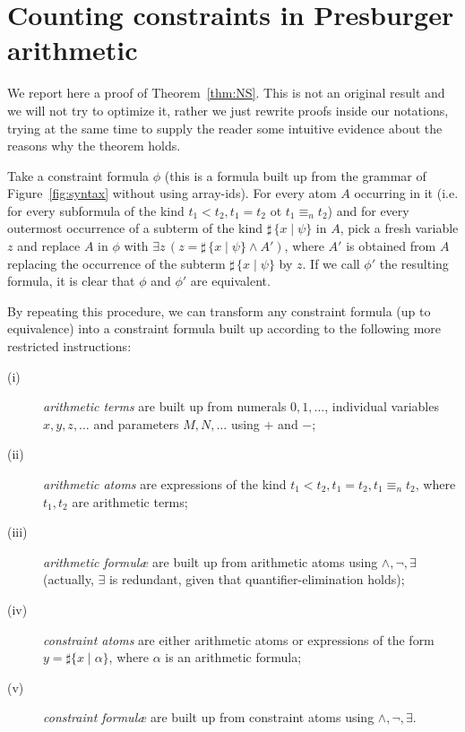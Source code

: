 \documentclass[11pt,a4paper]{article}
\newcommand{\formulae}{formul\ae\xspace}
\begin{document}
{



\vfill\eject 
\appendix


\section{Counting constraints in Presburger arithmetic}\label{app:counting}

We report here a proof of Theorem~\ref{thm:NS}. This is not an original result and we will not try to optimize it, rather we just rewrite  proofs inside our notations, 
trying at the same time to supply the reader some intuitive evidence about the reasons why the theorem
holds.


Take a constraint formula  $\phi$ (this is a formula built up from the  grammar of Figure~\ref{fig:syntax} without using
 array-ids). For every atom $A$ occurring in it (i.e. for every subformula of the kind $t_1< t_2, t_1= t_2$ ot $t_1\equiv_n t_2$)
 and for every outermost occurrence of a subterm of the kind $\sharp\, \{ x\mid \psi\}$ in $A$, pick a fresh variable $z$ and replace $A$
 in $\phi$ with 
 $\exists z\, (z= \sharp\, \{ x\mid \psi\} \wedge A')$, where $A'$ is obtained from $A$ replacing the occurrence of the 
 subterm $\sharp\, \{ x\mid \psi\}$ by $z$. If we call $\phi'$ the resulting formula, it is clear that $\phi$ and $\phi'$ are equivalent.
 
 By repeating this procedure, we can transform any constraint formula (up to equivalence) into a constraint formula built up according to the following
 more restricted instructions:
\begin{description}
  \item[{\rm (i)}] \emph{arithmetic terms} are built up from numerals $0, 1, \dots $, individual variables $x, y, z, \dots $ and parameters $ M, N, \dots $ using $+$ and $-$;
  \item[{\rm (ii)}] \emph{arithmetic atoms} are expressions of the kind $t_1<t_2, t_1=t_2, t_1\equiv_n t_2$, where $t_1, t_2$ are arithmetic terms;
  \item[{\rm (iii)}] \emph{arithmetic \formulae} are built up from arithmetic atoms using $\wedge, \neg, \exists$ (actually, $\exists$ is redundant, given that quantifier-elimination holds);
  \item[{\rm (iv)}] \emph{constraint atoms} are either arithmetic atoms or expressions of the form $y=\sharp\{ x\mid \alpha\}$, where $\alpha$ is an arithmetic formula;
  \item[{\rm (v)}] \emph{constraint \formulae} are built up from constraint atoms using  $\wedge, \neg, \exists$.
 \end{description}

}
\end{document}
